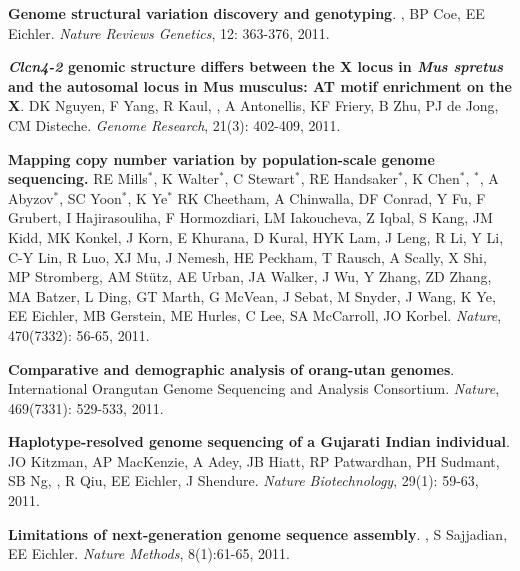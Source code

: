 \vspace{-.2cm}
    {\bf Genome structural variation discovery and genotyping}. 
    \calkan{}, BP Coe, EE Eichler.
    {\em Nature Reviews Genetics}, 12: 363-376, 2011.
    
\vspace{-.2cm}
    {\bf {\em Clcn4-2} genomic structure differs between the X locus in \textit{Mus spretus} and the autosomal locus in Mus musculus: AT motif enrichment on the X}.  
    DK Nguyen, F Yang, R Kaul, \calkan{}, A Antonellis, KF Friery, 
    B Zhu, PJ de Jong, CM Disteche. {\em Genome Research}, 21(3): 402-409, 2011.
    
\vspace{-.2cm}
    {\bf Mapping copy number variation by population-scale genome sequencing.}
    RE Mills$^\ast$, K Walter$^\ast$, C Stewart$^\ast$, RE Handsaker$^\ast$, K Chen$^\ast$, 
    \calkan{}$^\ast$, A Abyzov$^\ast$, SC Yoon$^\ast$, K Ye$^\ast$ RK Cheetham, 
    A Chinwalla, DF Conrad, Y Fu, F Grubert, I Hajirasouliha, 
    F Hormozdiari, LM Iakoucheva, Z Iqbal, S Kang, JM Kidd, 
    MK Konkel, J Korn, E Khurana, D Kural, HYK Lam, J Leng, 
    R Li, Y Li, C-Y Lin, R Luo, XJ Mu, J Nemesh,
    HE Peckham, T Rausch, A Scally, X Shi, MP Stromberg, 
    AM St\"{u}tz, AE Urban, JA Walker, J Wu, Y Zhang, 
    ZD Zhang, MA Batzer, L Ding, GT Marth, G McVean, 
    J Sebat, M Snyder, J Wang, K Ye, EE Eichler, 
    MB Gerstein, ME Hurles, C Lee, SA McCarroll,  JO Korbel.
    {\em Nature}, 470(7332): 56-65, 2011.
    
\vspace{-.2cm}
    {\bf Comparative and demographic analysis of orang-utan genomes}. 
    International Orangutan Genome Sequencing and Analysis Consortium.
    {\em Nature}, 469(7331): 529-533, 2011.
    

\vspace{-.2cm}
    {\bf Haplotype-resolved genome sequencing of a Gujarati Indian individual}.
    JO Kitzman, AP MacKenzie, A Adey, JB Hiatt, RP Patwardhan, 
    PH Sudmant, SB Ng, \calkan{}, R Qiu, EE
    Eichler, J Shendure.
    {\em Nature Biotechnology}, 29(1): 59-63, 2011.
    
\vspace{-.2cm}
    {\bf Limitations of next-generation genome sequence assembly}.
    \calkan{}, S Sajjadian, EE Eichler.
    {\em Nature Methods}, 8(1):61-65, 2011. \\
    
